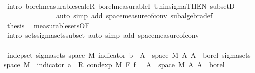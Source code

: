 \begin{isabellebody}
\ \ \ \ \ \ \ \ \ \ \ \ \isamarkupfalse%
\ {\isacharparenleft}{\kern0pt}intro\ borel{\isacharunderscore}{\kern0pt}measurable{\isacharunderscore}{\kern0pt}scaleR\ borel{\isacharunderscore}{\kern0pt}measurableI\ Un{\isacharunderscore}{\kern0pt}in{\isacharunderscore}{\kern0pt}sigma{\isacharbrackleft}{\kern0pt}THEN\ subsetD{\isacharbrackright}{\kern0pt}{\isacharparenright}{\kern0pt}\isanewline
\ \ \ \ \ \ \ \ \ \ \ \ \ \ \ {\isacharparenleft}{\kern0pt}auto\ simp\ add{\isacharcolon}{\kern0pt}\ space{\isacharunderscore}{\kern0pt}measure{\isacharunderscore}{\kern0pt}of{\isacharunderscore}{\kern0pt}conv\ subalgebra{\isacharunderscore}{\kern0pt}def{\isacharparenright}{\kern0pt}\isanewline
\ \ \ \ \ \ \ \ \ \ \isamarkupfalse%
\ {\isacharquery}{\kern0pt}thesis\ \isamarkupfalse%
\ measurable{\isacharunderscore}{\kern0pt}sets{\isacharbrackleft}{\kern0pt}OF\ {\isacharasterisk}{\kern0pt}{\isacharbrackright}{\kern0pt}\ \isamarkupfalse%
\ {\isacharparenleft}{\kern0pt}intro\ sets{\isachardot}{\kern0pt}sigma{\isacharunderscore}{\kern0pt}sets{\isacharunderscore}{\kern0pt}subset{\isacharprime}{\kern0pt}{\isacharcomma}{\kern0pt}\ auto\ simp\ add{\isacharcolon}{\kern0pt}\ space{\isacharunderscore}{\kern0pt}measure{\isacharunderscore}{\kern0pt}of{\isacharunderscore}{\kern0pt}conv{\isacharparenright}{\kern0pt}\isanewline
\ \ \ \ \ \ \ \ \isamarkupfalse%
\isanewline
\ \ \ \ \ \ \ \ \isamarkupfalse%
\ {\isachardoublequoteopen}indep{\isacharunderscore}{\kern0pt}set\ {\isacharparenleft}{\kern0pt}sigma{\isacharunderscore}{\kern0pt}sets\ {\isacharparenleft}{\kern0pt}space\ M{\isacharparenright}{\kern0pt}\ {\isacharbraceleft}{\kern0pt}indicator\ b\ {\isacharminus}{\kern0pt}{\isacharbackquote}{\kern0pt}\ A\ {\isasyminter}\ space\ M\ {\isacharbar}{\kern0pt}A{\isachardot}{\kern0pt}\ A\ {\isasymin}\ borel{\isacharbraceright}{\kern0pt}{\isacharparenright}{\kern0pt}\ {\isacharparenleft}{\kern0pt}sigma{\isacharunderscore}{\kern0pt}sets\ {\isacharparenleft}{\kern0pt}space\ M{\isacharparenright}{\kern0pt}\ {\isacharbraceleft}{\kern0pt}{\isacharparenleft}{\kern0pt}{\isasymlambda}{\isasymomega}{\isachardot}{\kern0pt}\ indicator\ a\ {\isasymomega}\ {\isacharasterisk}{\kern0pt}\isactrlsub R\ cond{\isacharunderscore}{\kern0pt}exp\ M\ F\ f\ {\isasymomega}{\isacharparenright}{\kern0pt}\ {\isacharminus}{\kern0pt}{\isacharbackquote}{\kern0pt}\ A\ {\isasyminter}\ space\ M\ {\isacharbar}{\kern0pt}A{\isachardot}{\kern0pt}\ A\ {\isasymin}\ borel{\isacharbraceright}{\kern0pt}{\isacharparenright}{\kern0pt}{\isachardoublequoteclose}\ \isanewline

\end{isabellebody}
